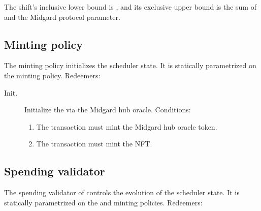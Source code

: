 \documentclass[../midgard.tex]{subfiles}
\begin{document}
The shift's inclusive lower bound is , and its exclusive upper bound is the sum of  and the  Midgard protocol parameter.

\subsection{Minting policy}
\label{h:scheduler-minting-policy}

The  minting policy initializes the scheduler state.
It is statically parametrized on the  minting policy.
Redeemers:

\begin{description}
    \item[Init.] Initialize the  via the Midgard hub oracle.
      Conditions:
        \begin{enumerate}
            \item The transaction must mint the Midgard hub oracle token.
            \item The transaction must mint the  NFT.
        \end{enumerate}
\end{description}

\subsection{Spending validator}
\label{h:scheduler-spending-validator}

The spending validator of  controls the evolution of the scheduler state.
It is statically parametrized on the  and  minting policies.
Redeemers:
\end{document}
